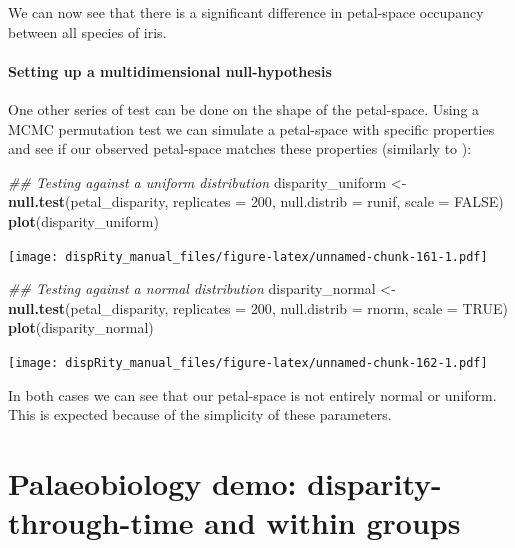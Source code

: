 \documentclass[]{book}
\newenvironment{Shaded}{\begin{snugshade}}{\end{snugshade}}
\newcommand{\CommentTok}[1]{\textcolor[rgb]{0.56,0.35,0.01}{\textit{#1}}}
\newcommand{\DataTypeTok}[1]{\textcolor[rgb]{0.13,0.29,0.53}{#1}}
\newcommand{\DecValTok}[1]{\textcolor[rgb]{0.00,0.00,0.81}{#1}}
\newcommand{\KeywordTok}[1]{\textcolor[rgb]{0.13,0.29,0.53}{\textbf{#1}}}
\newcommand{\NormalTok}[1]{#1}
\newcommand{\OtherTok}[1]{\textcolor[rgb]{0.56,0.35,0.01}{#1}}
\newcommand{\StringTok}[1]{\textcolor[rgb]{0.31,0.60,0.02}{#1}}
\begin{document}
We can now see that there is a significant difference in petal-space occupancy between all species of iris.

\hypertarget{setting-up-a-multidimensional-null-hypothesis}{%
\subsubsection{Setting up a multidimensional null-hypothesis}\label{setting-up-a-multidimensional-null-hypothesis}}

One other series of test can be done on the shape of the petal-space.
Using a MCMC permutation test we can simulate a petal-space with specific properties and see if our observed petal-space matches these properties (similarly to \citet{diaz2016global}):

\begin{Shaded}
\begin{Highlighting}[]
\CommentTok{## Testing against a uniform distribution}
\NormalTok{disparity_uniform <-}\StringTok{ }\KeywordTok{null.test}\NormalTok{(petal_disparity, }\DataTypeTok{replicates =} \DecValTok{200}\NormalTok{,}
    \DataTypeTok{null.distrib =}\NormalTok{ runif, }\DataTypeTok{scale =} \OtherTok{FALSE}\NormalTok{)}
\KeywordTok{plot}\NormalTok{(disparity_uniform)}
\end{Highlighting}
\end{Shaded}

\texttt{[image: dispRity\_manual\_files/figure-latex/unnamed-chunk-161-1.pdf]}

\begin{Shaded}
\begin{Highlighting}[]
\CommentTok{## Testing against a normal distribution}
\NormalTok{disparity_normal <-}\StringTok{ }\KeywordTok{null.test}\NormalTok{(petal_disparity, }\DataTypeTok{replicates =} \DecValTok{200}\NormalTok{,}
    \DataTypeTok{null.distrib =}\NormalTok{ rnorm, }\DataTypeTok{scale =} \OtherTok{TRUE}\NormalTok{)}
\KeywordTok{plot}\NormalTok{(disparity_normal)}
\end{Highlighting}
\end{Shaded}

\texttt{[image: dispRity\_manual\_files/figure-latex/unnamed-chunk-162-1.pdf]}

In both cases we can see that our petal-space is not entirely normal or uniform.
This is expected because of the simplicity of these parameters.

\hypertarget{palaeobiology-demo-disparity-through-time-and-within-groups}{%
\chapter{Palaeobiology demo: disparity-through-time and within groups}\label{palaeobiology-demo-disparity-through-time-and-within-groups}}
\end{document}
